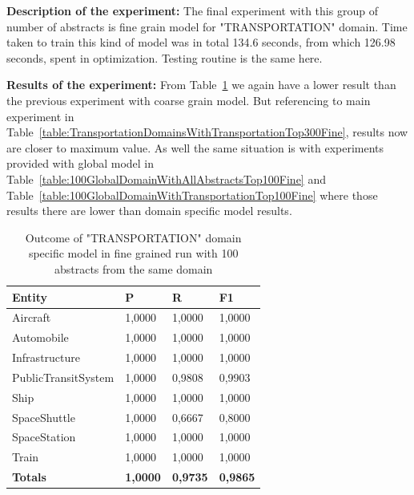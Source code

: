 \documentclass[thesis=M,english]{FITthesis}[2018/05/30]
\begin{document}
	\textbf{Description of the experiment:} The final experiment with this group of number of abstracts is fine grain model for "TRANSPORTATION" domain. Time taken to train this kind of model was in total 134.6 seconds, from which 126.98 seconds, spent in optimization. Testing routine is the same here.

	\textbf{Results of the experiment:} From Table~\ref{table:100TransportationDomainWithTransportationTop100Fine} we again have a lower result than the previous experiment with coarse grain model. But referencing to main experiment in Table~\ref{table:TransportationDomainsWithTransportationTop300Fine}, results now are closer to maximum value. As well the same situation is with experiments provided with global model in Table~\ref{table:100GlobalDomainWithAllAbstractsTop100Fine} and Table~\ref{table:100GlobalDomainWithTransportationTop100Fine} where those results there are lower than domain specific model results.
	
	\begin{table}[H]\centering
		\begin{tabular}{|l|l|l|l|}
			\hline {\textbf{Entity}} & {\textbf{P}} & {\textbf{R}} & {\textbf{F1}}\\\hline
				Aircraft & 1,0000 & 1,0000 & 1,0000\\
				Automobile & 1,0000 & 1,0000 & 1,0000\\				
				Infrastructure & 1,0000 & 1,0000 & 1,0000\\
				PublicTransitSystem & 1,0000 & 0,9808 & 0,9903\\
				Ship & 1,0000 & 1,0000 & 1,0000\\				
				SpaceShuttle & 1,0000 & 0,6667 & 0,8000\\
				SpaceStation & 1,0000 & 1,0000 & 1,0000\\
				Train & 1,0000 & 1,0000 & 1,0000\\\hline
				\textbf{Totals} & \textbf{1,0000} & \textbf{0,9735} & \textbf{0,9865}\\\hline
		\end{tabular}
		\caption{Outcome of "TRANSPORTATION" domain specific model in fine grained run with 100 abstracts from the same domain \label{table:100TransportationDomainWithTransportationTop100Fine}}
	\end{table}	
\end{document}
